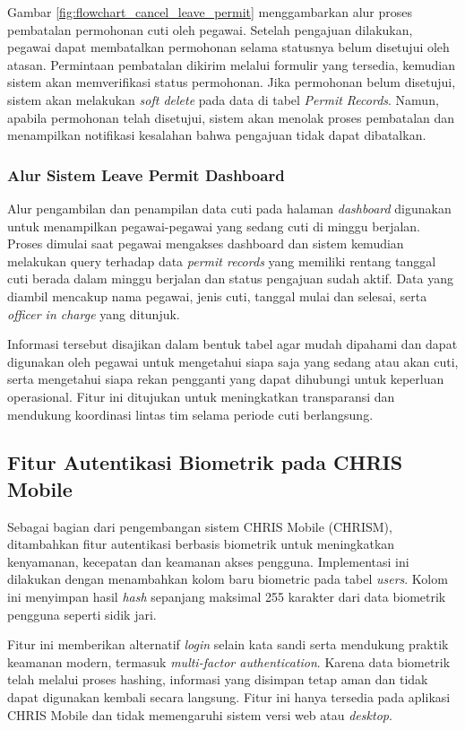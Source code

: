 Gambar \ref{fig:flowchart_cancel_leave_permit} menggambarkan alur proses pembatalan permohonan cuti oleh pegawai. Setelah pengajuan dilakukan, pegawai dapat membatalkan permohonan selama statusnya belum disetujui oleh atasan. Permintaan pembatalan dikirim melalui formulir yang tersedia, kemudian sistem akan memverifikasi status permohonan. Jika permohonan belum disetujui, sistem akan melakukan \textit{soft delete} pada data di tabel \textit{Permit Records}. Namun, apabila permohonan telah disetujui, sistem akan menolak proses pembatalan dan menampilkan notifikasi kesalahan bahwa pengajuan tidak dapat dibatalkan.

\subsubsection{Alur Sistem Leave Permit Dashboard}
Alur pengambilan dan penampilan data cuti pada halaman \textit{dashboard} digunakan untuk menampilkan pegawai-pegawai yang sedang cuti di minggu berjalan. Proses dimulai saat pegawai mengakses dashboard dan sistem kemudian melakukan query terhadap data \textit{permit records} yang memiliki rentang tanggal cuti berada dalam minggu berjalan dan status pengajuan sudah aktif. Data yang diambil mencakup nama pegawai, jenis cuti, tanggal mulai dan selesai, serta \textit{officer in charge} yang ditunjuk.

Informasi tersebut disajikan dalam bentuk tabel agar mudah dipahami dan dapat digunakan oleh pegawai untuk mengetahui siapa saja yang sedang atau akan cuti, serta mengetahui siapa rekan pengganti yang dapat dihubungi untuk keperluan operasional. Fitur ini ditujukan untuk meningkatkan transparansi dan mendukung koordinasi lintas tim selama periode cuti berlangsung.


\subsection{Fitur Autentikasi Biometrik pada CHRIS Mobile}
Sebagai bagian dari pengembangan sistem CHRIS Mobile (CHRISM), ditambahkan fitur autentikasi berbasis biometrik untuk meningkatkan kenyamanan, kecepatan dan keamanan akses pengguna. Implementasi ini dilakukan dengan menambahkan kolom baru biometric pada tabel \textit{users}. Kolom ini menyimpan hasil \textit{hash} sepanjang maksimal 255 karakter dari data biometrik pengguna seperti sidik jari.

Fitur ini memberikan alternatif \textit{login} selain kata sandi serta mendukung praktik keamanan modern, termasuk \textit{multi-factor authentication}. Karena data biometrik telah melalui proses hashing, informasi yang disimpan tetap aman dan tidak dapat digunakan kembali secara langsung. Fitur ini hanya tersedia pada aplikasi CHRIS Mobile dan tidak memengaruhi sistem versi web atau \textit{desktop}.

